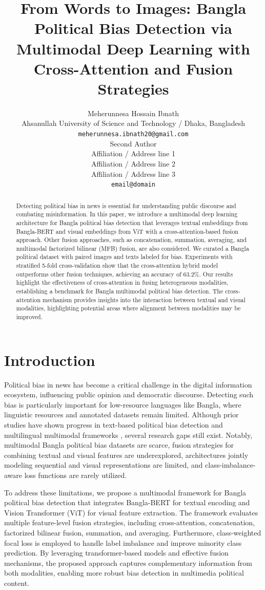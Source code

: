 \documentclass[11pt]{article}
\title{From Words to Images: Bangla Political Bias Detection via Multimodal Deep Learning with Cross-Attention and Fusion Strategies}
\author{Meherunnesa Hossain Ibnath \\
  Ahsanullah University of Science and Technology / Dhaka, Bangladesh\\
  \texttt{meherunnesa.ibnath20@gmail.com} \\\And
  Second Author \\
  Affiliation / Address line 1 \\
  Affiliation / Address line 2 \\
  Affiliation / Address line 3 \\
  \texttt{email@domain} \\}
\begin{document}
\maketitle
\begin{abstract}
Detecting political bias in news is essential for understanding public discourse and combating misinformation. In this paper, we introduce a multimodal deep learning architecture for Bangla political bias detection that leverages textual embeddings from Bangla-BERT and visual embeddings from ViT with a cross-attention-based fusion approach. Other fusion approaches, such as concatenation, summation, averaging, and multimodal factorized bilinear (MFB) fusion, are also considered. We curated a Bangla political dataset with paired images and texts labeled for bias. Experiments with stratified 5-fold cross-validation show that the cross-attention hybrid model outperforms other fusion techniques, achieving an accuracy of 63.2\%. Our results highlight the effectiveness of cross-attention in fusing heterogeneous modalities, establishing a benchmark for Bangla multimodal political bias detection. The cross-attention mechanism provides insights into the interaction between textual and visual modalities, highlighting potential areas where alignment between modalities may be improved.
\end{abstract}


\section{Introduction}

Political bias in news has become a critical challenge in the digital information ecosystem, influencing public opinion and democratic discourse. Detecting such bias is particularly important for low-resource languages like Bangla, where linguistic resources and annotated datasets remain limited. Although prior studies have shown progress in text-based political bias detection \citep{arman2025bengali, lia2025read} and multilingual multimodal frameworks \citep{bernard2025multimodal, thapa2025multimodal, mitra2026breaking}, several research gaps still exist. Notably, multimodal Bangla political bias datasets are scarce, fusion strategies for combining textual and visual features are underexplored, architectures jointly modeling sequential and visual representations are limited, and class-imbalance-aware loss functions are rarely utilized.

To address these limitations, we propose a multimodal framework for Bangla political bias detection that integrates Bangla-BERT for textual encoding and Vision Transformer (ViT) for visual feature extraction. The framework evaluates multiple feature-level fusion strategies, including cross-attention, concatenation, factorized bilinear fusion, summation, and averaging. Furthermore, class-weighted focal loss is employed to handle label imbalance and improve minority class prediction. By leveraging transformer-based models and effective fusion mechanisms, the proposed approach captures complementary information from both modalities, enabling more robust bias detection in multimedia political content.
\end{document}
